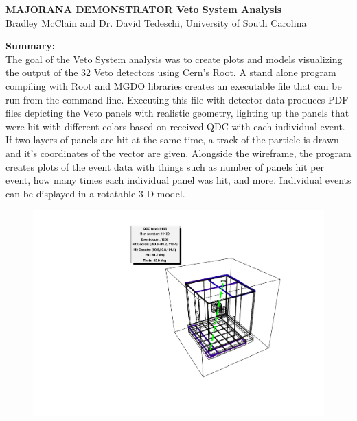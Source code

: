\documentclass[a4paper,12pt]{article}
\begin{document}
\begin{center}
\textbf{MAJORANA DEMONSTRATOR Veto System Analysis}
\fontsize{10}{12}\selectfont \\
\bigskip
Bradley McClain and Dr. David Tedeschi, University of South Carolina
\end{center}
\pagebreak

\textbf{Summary:} \\
The goal of the Veto System analysis was to create plots and models visualizing the output of the 32 Veto detectors using Cern's Root. A stand alone program compiling with Root and MGDO libraries creates an executable file that can be run from the command line. Executing this file with detector data produces PDF files depicting the Veto panels with realistic geometry, lighting up the panels that were hit with different colors based on received QDC with each individual event. If two layers of panels are hit at the same time, a track of the particle is drawn and it's coordinates of the vector are given. Alongside the wireframe, the program creates plots of the event data with things such as number of panels hit per event, how many times each individual panel was hit, and more. Individual events can be displayed in a rotatable 3-D model.

\begin{figure}[h]
\centering
\includegraphics[scale=0.5]{assembly95.pdf}
\end{figure}

\pagebreak
\end{document}
